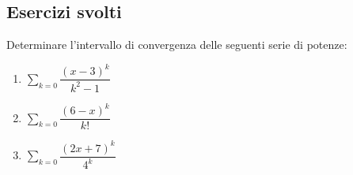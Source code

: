 \documentclass[a4paper, 12pt]{report}
\begin{document}
    \subsection{Esercizi svolti}

    \begin{framedprob}{}
        Determinare l'intervallo di convergenza delle seguenti serie di potenze:
        \begin{enumerate}
            \item $\sum\limits_{k = 0} \dfrac{(x-3)^k}{k^2-1}$
            \item $\sum\limits_{k = 0} \dfrac{(6-x)^k}{k!}$
            \item $\sum\limits_{k = 0} \dfrac{(2x+7)^k}{4^k}$
        \end{enumerate}
    \end{framedprob}
\end{document}
